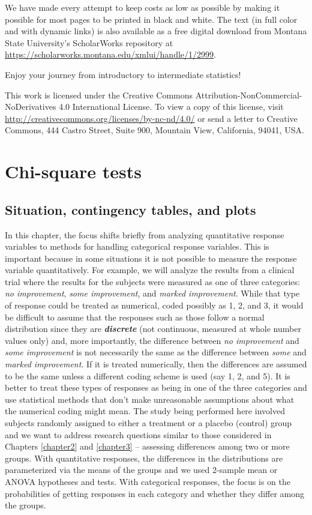 \documentclass[]{book}
\theoremstyle{definition}
\theoremstyle{definition}
\theoremstyle{remark}
\begin{document}
We have made every attempt to keep costs as low as possible by making it
possible for most pages to be printed in black and white. The text (in
full color and with dynamic links) is also available as a free digital
download from Montana State University's ScholarWorks repository at
\url{https://scholarworks.montana.edu/xmlui/handle/1/2999}.

Enjoy your journey from introductory to intermediate statistics!

This work is licensed under the Creative Commons
Attribution-NonCommercial-NoDerivatives 4.0 International License. To
view a copy of this license, visit
\url{http://creativecommons.org/licenses/by-nc-nd/4.0/} or send a letter
to Creative Commons, 444 Castro Street, Suite 900, Mountain View,
California, 94041, USA.

\chapter{Chi-square tests}\label{chapter5}

\section{Situation, contingency tables, and plots}\label{section5-1}

In this chapter, the focus shifts briefly from analyzing quantitative
response variables to methods for handling categorical response
variables. This is important because in some situations it is not
possible to measure the response variable quantitatively. For example,
we will analyze the results from a clinical trial where the results for
the subjects were measured as one of three categories: \emph{no
improvement}, \emph{some improvement}, and \emph{marked improvement}.
While that type of response could be treated as numerical, coded
possibly as 1, 2, and 3, it would be difficult to assume that the
responses such as those follow a normal distribution since they are
\textbf{\emph{discrete}} (not continuous, measured at whole number
values only) and, more importantly, the difference between \emph{no
improvement} and \emph{some improvement} is not necessarily the same as
the difference between \emph{some} and \emph{marked improvement}. If it
is treated numerically, then the differences are assumed to be the same
unless a different coding scheme is used (say 1, 2, and 5). It is better
to treat these types of responses as being in one of the three
categories and use statistical methods that don't make unreasonable
assumptions about what the numerical coding might mean. The study being
performed here involved subjects randomly assigned to either a treatment
or a placebo (control) group and we want to address research questions
similar to those considered in Chapters \ref{chapter2} and
\ref{chapter3} -- assessing differences among two or more groups. With
quantitative responses, the differences in the distributions are
parameterized via the means of the groups and we used 2-sample mean or
ANOVA hypotheses and tests. With categorical responses, the focus is on
the probabilities of getting responses in each category and whether they
differ among the groups.
\end{document}
